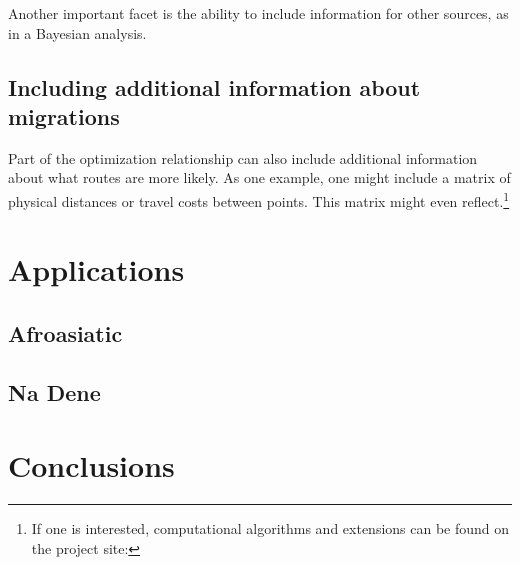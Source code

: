 \documentclass[11pt]{article}
\begin{document}
Another important facet is the ability to include information for other sources, as in a Bayesian analysis. 

\subsection{Including additional information about migrations}

Part of the optimization relationship can also include additional information about what routes are more likely. As one example, one might include a matrix of physical distances or travel costs between points. This matrix might even reflect.\footnote{If one is interested, computational algorithms and extensions can be found on the project site:} 

\section{Applications}

\subsection{Afroasiatic}

\subsection{Na Dene}

\section{Conclusions}


\newpage


\end{document}
